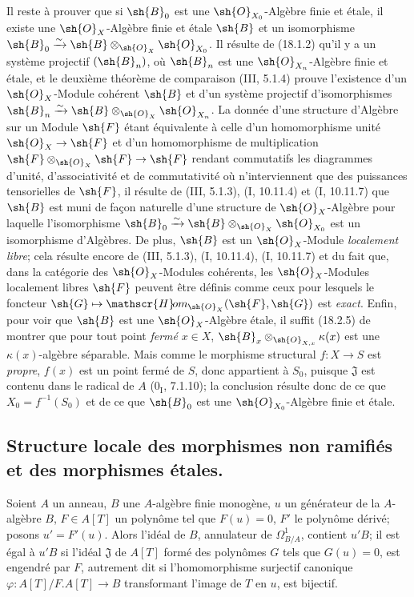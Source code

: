 Il reste à prouver que si $\sh{B}_0$ est une $\sh{O}_{X_0}$-Algèbre finie et étale, il existe une $\sh{O}_X$-Algèbre finie et étale $\sh{B}$ et un isomorphisme $\sh{B}_0\xrightarrow{\sim}\sh{B}\otimes_{\sh{O}_X}\sh{O}_{X_0}$. Il résulte de (18.1.2) qu'il y a un système projectif $(\sh{B}_n)$, où $\sh{B}_n$ est une $\sh{O}_{X_n}$-Algèbre finie et étale, et le deuxième théorème de comparaison (III, 5.1.4) prouve l'existence d'un $\sh{O}_X$-Module cohérent $\sh{B}$ et d'un système projectif d'isomorphismes $\sh{B}_n\xrightarrow{\sim}\sh{B}\otimes_{\sh{O}_X}\sh{O}_{X_n}$. La donnée d'une structure d'Algèbre sur un Module $\sh{F}$ étant équivalente à celle d'un homomorphisme unité $\sh{O}_X\to\sh{F}$ et d'un homomorphisme de multiplication $\sh{F}\otimes_{\sh{O}_X}\sh{F}\to\sh{F}$ rendant commutatifs les diagrammes d'unité, d'associativité et de commutativité où n'interviennent que des puissances tensorielles de $\sh{F}$, il résulte de (III, 5.1.3), (I, 10.11.4) et (I, 10.11.7) que $\sh{B}$ est muni de façon naturelle d'une structure de $\sh{O}_X$-Algèbre pour laquelle l'isomorphisme $\sh{B}_0\xrightarrow{\sim}\sh{B}\otimes_{\sh{O}_X}\sh{O}_{X_0}$ est un isomorphisme d'Algèbres. De plus, $\sh{B}$ est un $\sh{O}_X$-Module \emph{localement libre}; cela résulte encore de (III, 5.1.3), (I, 10.11.4), (I, 10.11.7) et du fait que, dans la catégorie des $\sh{O}_X$-Modules cohérents, les $\sh{O}_X$-Modules localement libres $\sh{F}$ peuvent être définis comme ceux pour lesquels le foncteur $\sh{G}\mapsto\mathscr{H}\!om_{\sh{O}_X}(\sh{F},\sh{G})$ est \emph{exact}. Enfin, pour voir que $\sh{B}$ est une $\sh{O}_X$-Algèbre étale, il suffit (18.2.5) de montrer que pour tout point \emph{fermé} $x\in X$, $\sh{B}_x\otimes_{\sh{O}_{X,x}}\kappa(x)$ est une $\kappa(x)$-algèbre séparable. Mais comme le morphisme structural $f:X\to S$ est \emph{propre}, $f(x)$ est un point fermé de $S$, donc appartient à $S_0$, puisque $\mathfrak J$ est contenu dans le radical de $A$ ($0_{\mathrm I}$, 7.1.10); la conclusion résulte donc de ce que $X_0=f^{-1}(S_0)$ et de ce que $\sh{B}_0$ est une $\sh{O}_{X_0}$-Algèbre finie et étale.

\subsection{Structure locale des morphismes non ramifiés et des morphismes étales.}


\begin{lemma}[18.4.1]
\label{IV.18.4.1}
Soient $A$ un anneau, $B$ une $A$-algèbre finie monogène, $u$ un générateur de la $A$-algèbre $B$, $F\in A[T]$ un polynôme tel que $F(u)=0$, $F'$ le polynôme dérivé; posons $u'=F'(u)$. Alors l'idéal de $B$, annulateur de $\Omega^1_{B/A}$, contient $u'B$; il est égal à $u'B$ si l'idéal $\mathfrak J$ de $A[T]$ formé des polynômes $G$ tels que $G(u)=0$, est engendré par $F$, autrement dit si l'homomorphisme surjectif canonique $\varphi:A[T]/F.A[T]\to B$ transformant l'image de $T$ en $u$, est bijectif.
\end{lemma}


